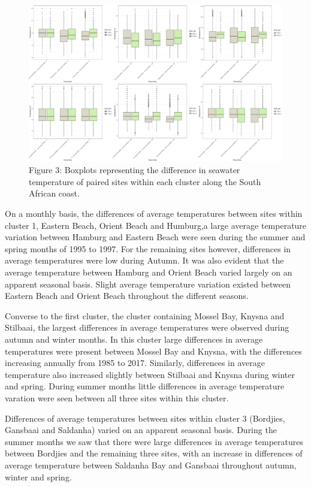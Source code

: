 \documentclass[12pt,]{article}
\begin{document}
\begin{figure}
\centering
\includegraphics{figures/combined_plot.pdf}
\caption{Figure 3: Boxplots representing the difference in seawater
temperature of paired sites within each cluster along the South African
coast.}
\end{figure}

On a monthly basis, the differences of average temperatures between
sites within cluster 1, Eastern Beach, Orient Beach and Humburg,a large
average temperature variation between Hamburg and Eastern Beach were
seen during the summer and spring months of 1995 to 1997. For the
remaining sites however, differences in average temperatures were low
during Autumn. It was also evident that the average temperature between
Hamburg and Orient Beach varied largely on an apparent seasonal basis.
Slight average temperature variation existed between Eastern Beach and
Orient Beach throughout the different seasons.

Converse to the first cluster, the cluster containing Mossel Bay, Knysna
and Stilbaai, the largest differences in average temperatures were
observed during autumn and winter months. In this cluster large
differences in average temperatures were present between Mossel Bay and
Knysna, with the differences increasing annually from 1985 to 2017.
Similarly, differences in average temperature also increased slightly
between Stilbaai and Knysna during winter and spring. During summer
months little differences in average temperature varation were seen
between all three sites within this cluster.

Differences of average temperatures between sites within cluster 3
(Bordjies, Gansbaai and Saldanha) varied on an apparent seasonal basis.
During the summer months we saw that there were large differences in
average temperatures between Bordjies and the remaining three sites,
with an increase in differences of average temperature between Saldanha
Bay and Gansbaai throughout autumn, winter and spring.
\end{document}
